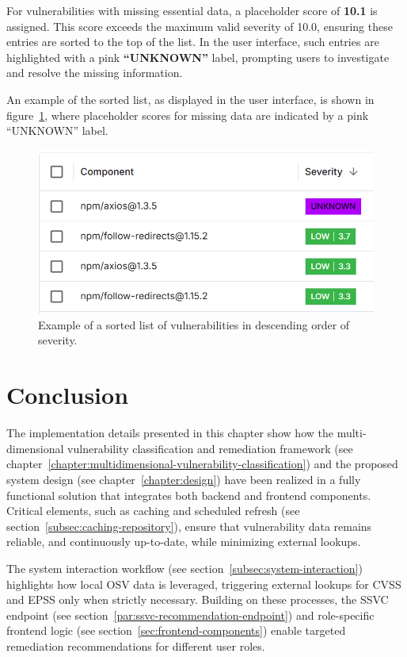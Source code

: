 For vulnerabilities with missing essential data, a placeholder score of \textbf{10.1} is assigned. This score exceeds the maximum valid severity of 10.0, ensuring these entries are sorted to the top of the list. In the user interface, such entries are highlighted with a pink \textbf{“UNKNOWN”} label, prompting users to investigate and resolve the missing information.

An example of the sorted list, as displayed in the user interface, is shown in figure~\ref{fig:rank-order-example}, where placeholder scores for missing data are indicated by a pink \enquote{UNKNOWN} label.

\begin{figure}[H]
    \centering
    \includegraphics[scale=0.7]{resources/Rank-Order.PNG}
    \caption{Example of a sorted list of vulnerabilities in descending order of severity.}
    \label{fig:rank-order-example}
\end{figure}

\section{Conclusion}
\label{sec:implementation-conclusion}

The implementation details presented in this chapter show how the multi-dimensional vulnerability classification and remediation framework (see chapter~\ref{chapter:multidimensional-vulnerability-classification}) and the proposed system design (see chapter~\ref{chapter:design}) have been realized in a fully functional solution that integrates both backend and frontend components. Critical elements, such as caching and scheduled refresh (see section~\ref{subsec:caching-repository}), ensure that vulnerability data remains reliable, and continuously up-to-date, while minimizing external lookups.

The system interaction workflow (see section~\ref{subsec:system-interaction}) highlights how local \ac{OSV} data is leveraged, triggering external lookups for \ac{CVSS} and \ac{EPSS} only when strictly necessary. Building on these processes, the \ac{SSVC} endpoint (see section~\ref{par:ssvc-recommendation-endpoint}) and role-specific frontend logic (see section~\ref{sec:frontend-components}) enable targeted remediation recommendations for different user roles.

